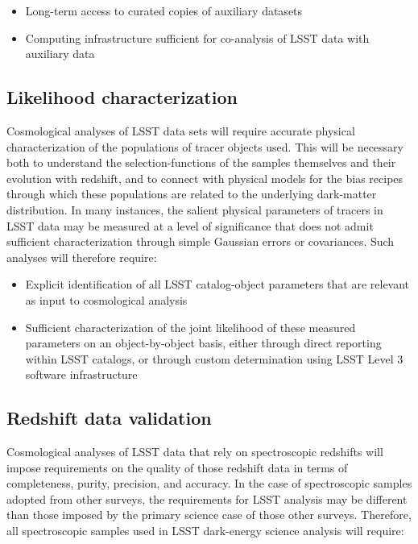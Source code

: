 \begin{itemize}
\item Long-term access to curated copies of auxiliary datasets
\item Computing infrastructure sufficient for co-analysis of LSST data with auxiliary data
\end{itemize}

\subsection{Likelihood characterization}

Cosmological analyses of LSST data sets will require accurate physical characterization of 
the populations of tracer objects used. This will be necessary both to understand the 
selection-functions of the samples themselves and their evolution with redshift, 
and to connect with physical models for the bias recipes through which these 
populations are related to the underlying dark-matter distribution. In many instances, the 
salient physical parameters of tracers in LSST data may be measured at a level of significance 
that does not admit sufficient characterization through simple Gaussian errors or covariances. 
Such analyses will therefore require: 

\begin{itemize}
\item Explicit identification of all LSST catalog-object 
parameters that are relevant as input to cosmological analysis
\item Sufficient characterization of the joint likelihood of these measured 
parameters on an object-by-object basis, either through direct reporting 
within LSST catalogs, or through custom determination using LSST Level 3 
software infrastructure
\end{itemize}

\subsection{Redshift data validation}

Cosmological analyses of LSST data that rely on spectroscopic redshifts will impose requirements on 
the quality of those redshift data in terms of completeness, purity, precision, and accuracy. In the case 
of spectroscopic samples adopted from other surveys, the requirements for LSST analysis may be 
different than those imposed by the primary science case of those other surveys. Therefore, all 
spectroscopic samples used in LSST dark-energy science analysis will require: 

